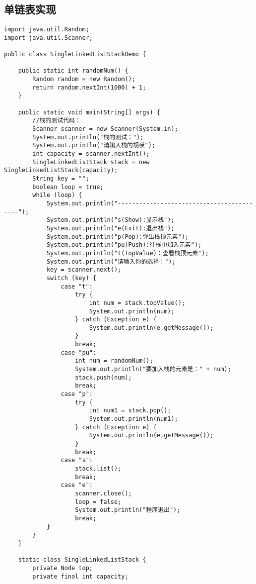 \documentclass[a4paper]{report}
\begin{document}
\subsection{单链表实现}
\begin{lstlisting}
import java.util.Random;
import java.util.Scanner;

public class SingleLinkedListStackDemo {

    public static int randomNum() {
        Random random = new Random();
        return random.nextInt(1000) + 1;
    }

    public static void main(String[] args) {
        //栈的测试代码：
        Scanner scanner = new Scanner(System.in);
        System.out.println("栈的测试：");
        System.out.println("请输入栈的规模");
        int capacity = scanner.nextInt();
        SingleLinkedListStack stack = new SingleLinkedListStack(capacity);
        String key = "";
        boolean loop = true;
        while (loop) {
            System.out.println("------------------------------------------");
            System.out.println("s(Show):显示栈");
            System.out.println("e(Exit):退出栈");
            System.out.println("p(Pop):弹出栈顶元素");
            System.out.println("pu(Push):往栈中加入元素");
            System.out.println("t(TopValue)：查看栈顶元素");
            System.out.println("请输入你的选择：");
            key = scanner.next();
            switch (key) {
                case "t":
                    try {
                        int num = stack.topValue();
                        System.out.println(num);
                    } catch (Exception e) {
                        System.out.println(e.getMessage());
                    }
                    break;
                case "pu":
                    int num = randomNum();
                    System.out.println("要加入栈的元素是：" + num);
                    stack.push(num);
                    break;
                case "p":
                    try {
                        int num1 = stack.pop();
                        System.out.println(num1);
                    } catch (Exception e) {
                        System.out.println(e.getMessage());
                    }
                    break;
                case "s":
                    stack.list();
                    break;
                case "e":
                    scanner.close();
                    loop = false;
                    System.out.println("程序退出");
                    break;
            }
        }
    }

    static class SingleLinkedListStack {
        private Node top;
        private final int capacity;


\end{lstlisting}
\end{document}
